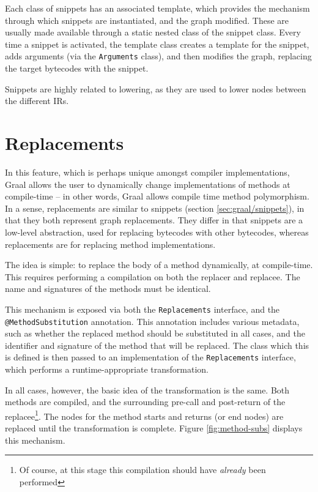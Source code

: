 Each class of snippets has an associated template, which provides the mechanism through which snippets are instantiated, and the graph modified. These are usually made available through a static nested class of the snippet class. Every time a snippet is activated, the template class creates a template for the snippet, adds arguments (via the \texttt{Arguments} class), and then modifies the graph, replacing the target bytecodes with the snippet.

Snippets are highly related to lowering, as they are used to lower nodes between the different IRs. 
	
\section{Replacements} \label{sec:graal/replacements}
In this feature, which is perhaps unique amongst compiler implementations, Graal allows the user to dynamically change implementations of methods at compile-time -- in other words, Graal allows compile time method polymorphism. In a sense, replacements are similar to snippets (section \ref{sec:graal/snippets}), in that they both represent graph replacements. They differ in that snippets are a low-level abstraction, used for replacing bytecodes with other bytecodes, whereas replacements are for replacing method implementations.

The idea is simple: to replace the body of a method dynamically, at compile-time. This requires performing a compilation on both the replacer and replacee. The name and signatures of the methods must be identical.

This mechanism is exposed via both the \texttt{Replacements} interface, and the\\ \texttt{{@}MethodSubstitution} annotation. This annotation includes various metadata, such as whether the replaced method should be substituted in all cases, and the identifier and signature of the method that will be replaced. The class which this is defined is then passed to an implementation of the \texttt{Replacements} interface, which performs a runtime-appropriate transformation.

In all cases, however, the basic idea of the transformation is the same. Both methods are compiled, and the surrounding pre-call and post-return of the replacee\footnote{Of course, at this stage this compilation should have \emph{already} been performed}. The nodes for the method starts and returns (or end nodes) are replaced until the transformation is complete. Figure \ref{fig:method-subs} displays this mechanism.

